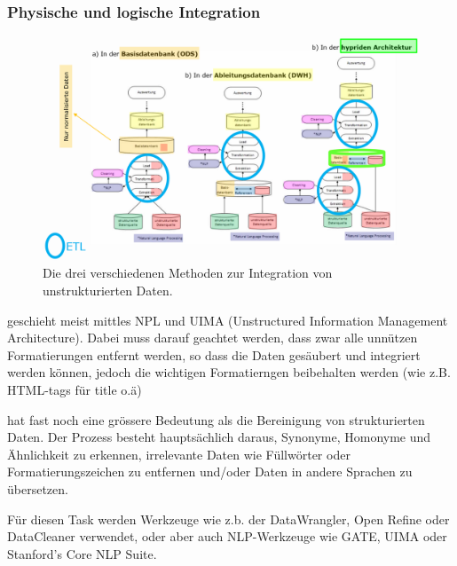 \documentclass[a4paper, 11pt, nofootinbib]{article}
\begin{document}
\subsubsection{Physische und logische Integration}
\begin{figure}[htb]
	\centering
	\includegraphics[keepaspectratio=true,height=15\baselineskip]{unstruktdata.PNG}
	\caption{Die drei verschiedenen Methoden zur Integration von unstrukturierten Daten.}
	\label{fig:logInt}
\end{figure}

 geschieht meist mittles NPL und UIMA (Unstructured Information Management Architecture). Dabei muss darauf geachtet werden, dass zwar alle unnützen Formatierungen entfernt werden, so dass die Daten gesäubert und integriert werden können, jedoch die wichtigen Formatierngen beibehalten werden (wie z.B. HTML-tags für title o.ä)

\vspace{10px}

 hat fast noch eine grössere Bedeutung als die Bereinigung von strukturierten Daten. Der Prozess besteht hauptsächlich daraus, Synonyme, Homonyme und Ähnlichkeit zu erkennen, irrelevante Daten wie Füllwörter oder Formatierungszeichen zu entfernen und/oder Daten in andere Sprachen zu übersetzen.

Für diesen Task werden Werkzeuge wie z.b. der DataWrangler, Open Refine oder DataCleaner verwendet, oder aber auch NLP-Werkzeuge wie GATE, UIMA oder Stanford's Core NLP Suite.
\vspace{10px}
\end{document}
